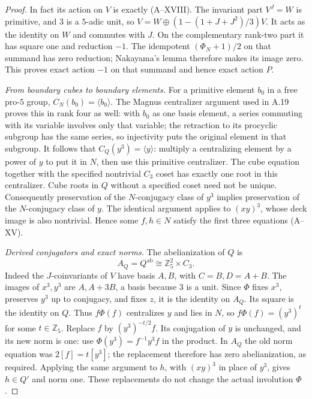 \begin{proof}
In fact its action on $V$ is exactly (A--XVIII).
The invariant part $V^J=W$ is primitive, and $3$
is a $5$-adic unit, so $V=W\oplus(1-(1+J+J^2)/3)V$.
It acts as the identity on $W$ and commutes with $J$.
On the complementary rank-two part it has square
one and reduction $-1$. The idempotent $(\Phi_N+1)/2$
on that summand has zero reduction; Nakayama's lemma
therefore makes its image zero. This proves exact
action $-1$ on that summand and hence exact action $P$.

\emph{From boundary cubes to boundary elements.}
For a primitive element $b_0$ in a free pro-$5$
group, $C_N(b_0)=\langle b_0\rangle$. The Magnus
centralizer argument used in A.19 proves this in
rank four as well: with $b_0$ as one basis element,
a series commuting with its variable involves only
that variable; the retraction to its procyclic
subgroup has the same series, so injectivity puts
the original element in that subgroup.
It follows that $C_Q(y^3)=\langle y\rangle$:
multiply a centralizing element by a power of $y$
to put it in $N$, then use this primitive centralizer.
The cube equation together with the specified
nontrivial $C_3$ coset has exactly one root in this
centralizer. Cube roots in $Q$ without a specified
coset need not be unique.
Consequently preservation of the $N$-conjugacy
class of $y^3$ implies preservation of the
$N$-conjugacy class of $y$. The identical argument
applies to $(xy)^3$, whose deck image is also
nontrivial. Hence some $f,h\in N$ satisfy the
first three equations (A--XV).

\emph{Derived conjugators and exact norms.}
The abelianization of $Q$ is
\[
                 A_Q=Q^{\mathrm{ab}}\cong\mathbb Z_5^2\times C_3.
                                                               \tag{A--XX}
\]
Indeed the $J$-coinvariants of $V$ have basis $A,B$,
with $C=B,D=A+B$. The images of $x^3,y^3$ are
$A,A+3B$, a basis because $3$ is a unit.
Since $\Phi$ fixes $x^3$, preserves $y^3$ up to
conjugacy, and fixes $z$, it is the identity on
$A_Q$. Its square is the identity on $Q$.
Thus $f\Phi(f)$ centralizes $y$ and lies in $N$,
so $f\Phi(f)=(y^3)^t$ for some $t\in\mathbb Z_5$.
Replace $f$ by $(y^3)^{-t/2}f$. Its conjugation
of $y$ is unchanged, and its new norm is one:
use $\Phi(y^3)=f^{-1}y^3f$ in the product.
In $A_Q$ the old norm equation was
$2[f]=t[y^3]$; the replacement therefore has
zero abelianization, as required.
Applying the same argument to $h$, with $(xy)^3$
in place of $y^3$, gives $h\in Q'$ and norm one.
These replacements do not change the actual
involution $\Phi$.


\end{proof}
